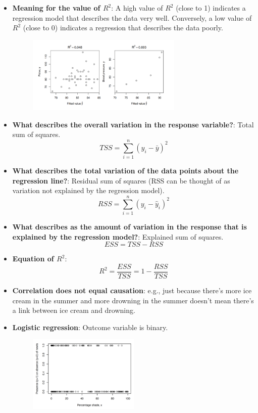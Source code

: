 \documentclass[12pt]{article}
\begin{document}
\begin{itemize}
\item \textbf{Meaning for the value of $R^2$}: A high value of $R^2$ (close to 1) indicates a regression model that describes the data very well. Conversely, a low value of $R^2$ (close to 0) indicates a regression that describes the data poorly.
\begin{figure}[H]
    \centering
    \includegraphics[width=0.7\textwidth]{9.png}
\end{figure}
\item \textbf{What describes the overall variation in the response variable?}: Total sum of squares.
$$TSS = \sum_{i=1}^{n} (y_i - \bar{y})^2$$
\item \textbf{What describes the total variation of the data points about the regression line?}: Residual sum of squares (RSS can be thought of as variation not explained by the regression model).
$$RSS = \sum_{i=1}^{n} (y_i - \hat{y}_i)^2$$
\item \textbf{What describes as the amount of variation in the response that is explained by the regression model?}: Explained sum of squares.
$$ESS = TSS - RSS$$
\item \textbf{Equation of $R^2$}: 
$$R^2 = \frac{ESS}{TSS} = 1 - \frac{RSS}{TSS}$$
\item \textbf{Correlation does not equal causation}: e.g., just because there's more ice cream in the summer and more drowning in the summer doesn't mean there's a link between ice cream and drowning.
\item \textbf{Logistic regression}: Outcome variable is binary.
\begin{figure}[H]
    \centering
    \includegraphics[width=0.5\textwidth]{91.png}

\end{figure}
\end{itemize}
\end{document}
